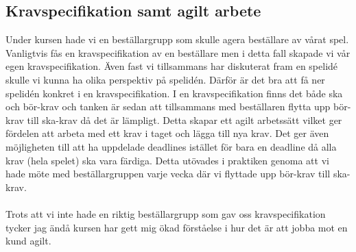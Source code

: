 \documentclass{TDP003mall}
\begin{document}
	\subsection{Kravspecifikation samt agilt arbete}
	Under kursen hade vi en beställargrupp som skulle agera beställare av vårat spel. Vanligtvis fås en kravspecifikation av en beställare men i detta fall skapade vi vår egen kravspecifikation. Även fast vi tillsammans har diskuterat fram en spelidé skulle vi kunna ha olika perspektiv på spelidén. Därför är det bra att få ner spelidén konkret i en kravspecifikation. I en kravspecifikation finns det både ska och bör-krav och tanken är sedan att tillsammans med beställaren flytta upp bör-krav till ska-krav då det är lämpligt. Detta skapar ett agilt arbetssätt vilket ger fördelen att arbeta med ett krav i taget och lägga till nya krav. Det ger även möjligheten till att ha uppdelade deadlines istället för bara en deadline då alla krav (hela spelet) ska vara färdiga. Detta utövades i praktiken genoma att vi hade möte med beställargruppen varje vecka där vi flyttade upp bör-krav till ska-krav.
	\\ \\
	Trots att vi inte hade en riktig beställargrupp som gav oss kravspecifikation tycker jag ändå kursen har gett mig ökad förståelse i hur det är att jobba mot en kund agilt.
	
\end{document}
